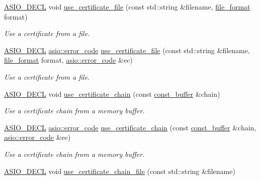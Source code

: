 \begin{DoxyCompactItemize}
\hyperlink{config_8hpp_ab54d01ea04afeb9a8b39cfac467656b7}{A\+S\+I\+O\+\_\+\+D\+E\+C\+L} void \hyperlink{classasio_1_1ssl_1_1context_ab4dad7ce2cf567896b1b7d4b88277dc7}{use\+\_\+certificate\+\_\+file} (const std\+::string \&filename, \hyperlink{classasio_1_1ssl_1_1context__base_acc846aa73fffcab1fecad36dcf2be1fb}{file\+\_\+format} format)
\begin{DoxyCompactList}\small\item\em Use a certificate from a file. \end{DoxyCompactList}\item 
\hyperlink{config_8hpp_ab54d01ea04afeb9a8b39cfac467656b7}{A\+S\+I\+O\+\_\+\+D\+E\+C\+L} \hyperlink{classasio_1_1error__code}{asio\+::error\+\_\+code} \hyperlink{classasio_1_1ssl_1_1context_a222359d9c6717c6a81607f06fa224b97}{use\+\_\+certificate\+\_\+file} (const std\+::string \&filename, \hyperlink{classasio_1_1ssl_1_1context__base_acc846aa73fffcab1fecad36dcf2be1fb}{file\+\_\+format} format, \hyperlink{classasio_1_1error__code}{asio\+::error\+\_\+code} \&ec)
\begin{DoxyCompactList}\small\item\em Use a certificate from a file. \end{DoxyCompactList}\item 
\hyperlink{config_8hpp_ab54d01ea04afeb9a8b39cfac467656b7}{A\+S\+I\+O\+\_\+\+D\+E\+C\+L} void \hyperlink{classasio_1_1ssl_1_1context_aef628e551cf26a4062ec282a55c0203c}{use\+\_\+certificate\+\_\+chain} (const \hyperlink{classasio_1_1const__buffer}{const\+\_\+buffer} \&chain)
\begin{DoxyCompactList}\small\item\em Use a certificate chain from a memory buffer. \end{DoxyCompactList}\item 
\hyperlink{config_8hpp_ab54d01ea04afeb9a8b39cfac467656b7}{A\+S\+I\+O\+\_\+\+D\+E\+C\+L} \hyperlink{classasio_1_1error__code}{asio\+::error\+\_\+code} \hyperlink{classasio_1_1ssl_1_1context_acc2840d00b0277f8ab9c17fa90bc556f}{use\+\_\+certificate\+\_\+chain} (const \hyperlink{classasio_1_1const__buffer}{const\+\_\+buffer} \&chain, \hyperlink{classasio_1_1error__code}{asio\+::error\+\_\+code} \&ec)
\begin{DoxyCompactList}\small\item\em Use a certificate chain from a memory buffer. \end{DoxyCompactList}\item 
\hyperlink{config_8hpp_ab54d01ea04afeb9a8b39cfac467656b7}{A\+S\+I\+O\+\_\+\+D\+E\+C\+L} void \hyperlink{classasio_1_1ssl_1_1context_a4df8302f01f1e6ccf6b2938d2f4c00d4}{use\+\_\+certificate\+\_\+chain\+\_\+file} (const std\+::string \&filename)

\end{DoxyCompactItemize}
